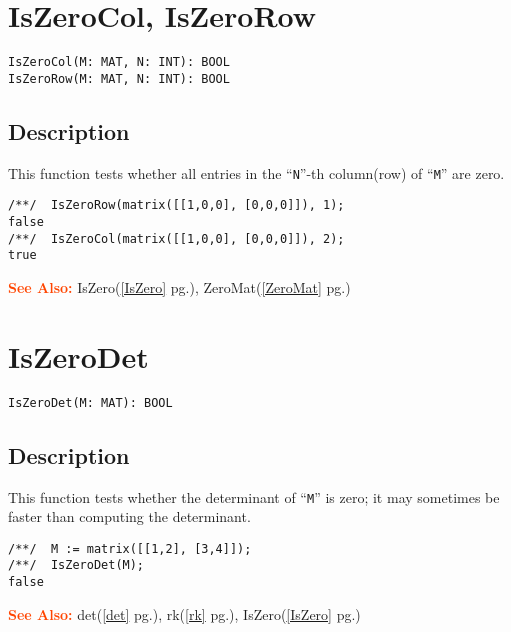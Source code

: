 \documentclass[a4paper]{mybook}
\newenvironment{command}{}{} %
\newcommand\SeeAlso{\par\textcolor{OrangeRed}{\textbf{\large See Also: }}}
\begin{document}
\section{IsZeroCol, IsZeroRow}
\label{IsZeroCol, IsZeroRow}
\begin{command} %


\begin{Verbatim}[label=syntax, rulecolor=\color{MidnightBlue},
frame=single]
IsZeroCol(M: MAT, N: INT): BOOL
IsZeroRow(M: MAT, N: INT): BOOL
\end{Verbatim}


\subsection*{Description}

This function tests whether all entries in the ``\verb&N&''-th column(row)
of ``\verb&M&'' are zero.
\begin{Verbatim}[label=example, rulecolor=\color{PineGreen}, frame=single]
/**/  IsZeroRow(matrix([[1,0,0], [0,0,0]]), 1);
false
/**/  IsZeroCol(matrix([[1,0,0], [0,0,0]]), 2);
true
\end{Verbatim}


\SeeAlso %
  IsZero(\ref{IsZero} pg.\pageref{IsZero}), 
    ZeroMat(\ref{ZeroMat} pg.\pageref{ZeroMat})
\end{command} %

\section{IsZeroDet}
\label{IsZeroDet}
\begin{command} %


\begin{Verbatim}[label=syntax, rulecolor=\color{MidnightBlue},
frame=single]
IsZeroDet(M: MAT): BOOL
\end{Verbatim}


\subsection*{Description}

This function tests whether the determinant of ``\verb&M&'' is zero; it may
sometimes be faster than computing the determinant.
\begin{Verbatim}[label=example, rulecolor=\color{PineGreen}, frame=single]
/**/  M := matrix([[1,2], [3,4]]);
/**/  IsZeroDet(M);
false
\end{Verbatim}


\SeeAlso %
  det(\ref{det} pg.\pageref{det}), 
    rk(\ref{rk} pg.\pageref{rk}), 
    IsZero(\ref{IsZero} pg.\pageref{IsZero})
\end{command} %
\end{document}
